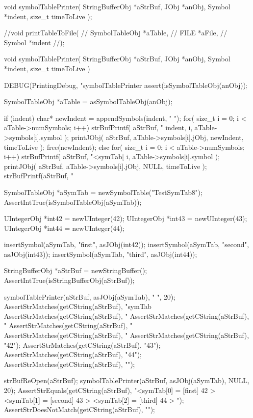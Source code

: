 \startTestSuite[symbolTablePrinter]

\startCHeader
void symbolTablePrinter(
  StringBufferObj *aStrBuf,
  JObj            *anObj,
  Symbol          *indent,
  size_t           timeToLive
);

//void printTableToFile(
//  SymbolTableObj *aTable,
//  FILE           *aFile,
//  Symbol         *indent
//);

\stopCHeader

\startCCode
void symbolTablePrinter(
  StringBufferObj *aStrBuf,
  JObj            *anObj,
  Symbol          *indent,
  size_t           timeToLive
) {
  DEBUG(PrintingDebug, "symbolTablePrinter %
  assert(isSymbolTableObj(anObj));
  
  SymbolTableObj *aTable = asSymbolTableObj(anObj);
  
  if (indent) {
    char* newIndent = appendSymbols(indent, "  ");
    for( size_t i = 0; i < aTable->numSymbols; i++) {
      strBufPrintf(
        aStrBuf,
        "%
        indent,
        i,
        aTable->symbols[i].symbol
      );
      printJObj(
        aStrBuf,
        aTable->symbols[i].jObj,
        newIndent,
        timeToLive
      );
    }
    free(newIndent);
  } else {
    for( size_t i = 0; i < aTable->numSymbols; i++) {
      strBufPrintf(
        aStrBuf,
        "<symTab[%
        i,
        aTable->symbols[i].symbol
      );
      printJObj(
        aStrBuf,
        aTable->symbols[i].jObj,
        NULL,
        timeToLive
      );
      strBufPrintf(aStrBuf, "%
    }
  }
}
\stopCCode


\startCTest
  SymbolTableObj *aSymTab = newSymbolTable("TestSymTab8");
  AssertIntTrue(isSymbolTableObj(aSymTab));

  UIntegerObj *int42 = newUInteger(42);
  UIntegerObj *int43 = newUInteger(43);
  UIntegerObj *int44 = newUInteger(44);
  
  insertSymbol(aSymTab, "first",  asJObj(int42));
  insertSymbol(aSymTab, "second", asJObj(int43));
  insertSymbol(aSymTab, "third",  asJObj(int44));
  
  StringBufferObj *aStrBuf = newStringBuffer();
  AssertIntTrue(isStringBufferObj(aStrBuf));

  symbolTablePrinter(aStrBuf, asJObj(aSymTab), "  ", 20);
  AssertStrMatches(getCString(aStrBuf), "symTab%
  AssertStrMatches(getCString(aStrBuf), "%
  AssertStrMatches(getCString(aStrBuf), "%
  AssertStrMatches(getCString(aStrBuf), "%
  AssertStrMatches(getCString(aStrBuf), "%
  AssertStrMatches(getCString(aStrBuf), "42");
  AssertStrMatches(getCString(aStrBuf), "43");
  AssertStrMatches(getCString(aStrBuf), "44");
  AssertStrMatches(getCString(aStrBuf), "\n");

  strBufReOpen(aStrBuf);
  symbolTablePrinter(aStrBuf, asJObj(aSymTab), NULL, 20);
  AssertStrEquals(getCString(aStrBuf), "<symTab[0] = [first] 42 > <symTab[1] = [second] 43 > <symTab[2] = [third] 44 > ");
  AssertStrDoesNotMatch(getCString(aStrBuf), "\n");
  
\stopCTest
\stopTestCase
\stopTestSuite